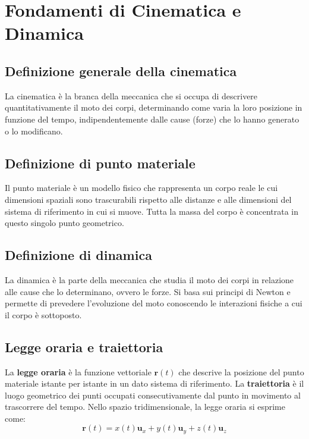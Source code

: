 \documentclass[12pt]{article}
\begin{document}
\section*{Fondamenti di Cinematica e Dinamica}

\subsection*{Definizione generale della cinematica}
La cinematica è la branca della meccanica che si occupa di descrivere quantitativamente il moto dei corpi, determinando come varia la loro posizione in funzione del tempo, indipendentemente dalle cause (forze) che lo hanno generato o lo modificano. %

\subsection*{Definizione di punto materiale}
Il punto materiale è un modello fisico che rappresenta un corpo reale le cui dimensioni spaziali sono trascurabili rispetto alle distanze e alle dimensioni del sistema di riferimento in cui si muove. Tutta la massa del corpo è concentrata in questo singolo punto geometrico.

\subsection*{Definizione di dinamica}
La dinamica è la parte della meccanica che studia il moto dei corpi in relazione alle cause che lo determinano, ovvero le forze. Si basa sui principi di Newton e permette di prevedere l'evoluzione del moto conoscendo le interazioni fisiche a cui il corpo è sottoposto.

\subsection*{Legge oraria e traiettoria}
La \textbf{legge oraria} è la funzione vettoriale $\mathbf{r}(t)$ che descrive la posizione del punto materiale istante per istante in un dato sistema di riferimento. %
La \textbf{traiettoria} è il luogo geometrico dei punti occupati consecutivamente dal punto in movimento al trascorrere del tempo. %
Nello spazio tridimensionale, la legge oraria si esprime come:
\begin{equation}
\mathbf{r}(t) = x(t)\mathbf{u}_x + y(t)\mathbf{u}_y + z(t)\mathbf{u}_z
\end{equation}
\end{document}
